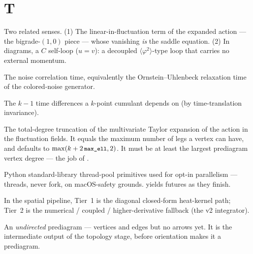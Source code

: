 \section*{T}
\begin{description}[leftmargin=0pt,style=nextline]

  \item[Tadpole] Two related senses. (1) The linear-in-fluctuation term of the
        expanded action --- the bigrade-$(1,0)$ piece --- whose vanishing \emph{is}
        the saddle equation. (2) In diagrams, a $C$ self-loop ($u=v$): a decoupled
        $\langle\varphi^{2}\rangle$-type loop that carries no external momentum.

  \item[$\tau_c$ (\code{tauc})] The noise correlation time, equivalently the
        Ornstein--Uhlenbeck relaxation time of the colored-noise generator.

  \item[$\tau_j=t_j-t_0$] The $k-1$ time differences a $k$-point cumulant depends on
        (by time-translation invariance).

  \item[Taylor order (\code{taylor\_order}, $N$)] The total-degree truncation of the
        multivariate Taylor expansion of the action in the fluctuation fields. It
        equals the maximum number of legs a vertex can have, and defaults to
        $\max(k+2\,\texttt{\small max\_ell},2)$. It must be at least the largest prediagram
        vertex degree --- the job of .

  \item[\code{ThreadPoolExecutor} / \code{as\_completed}] Python standard-library
        thread-pool primitives used for opt-in parallelism --- threads, never fork,
        on macOS-safety grounds.  yields futures as they finish.

  \item[Tier 1 vs Tier 2] In the spatial pipeline, Tier~1 is the diagonal
        closed-form heat-kernel path; Tier~2 is the numerical / coupled /
        higher-derivative fallback (the v2 integrator).

  \item[Topology] An \emph{undirected} prediagram --- vertices and edges but no
        arrows yet. It is the intermediate output of the topology stage, before
        orientation makes it a prediagram.


\end{description}
